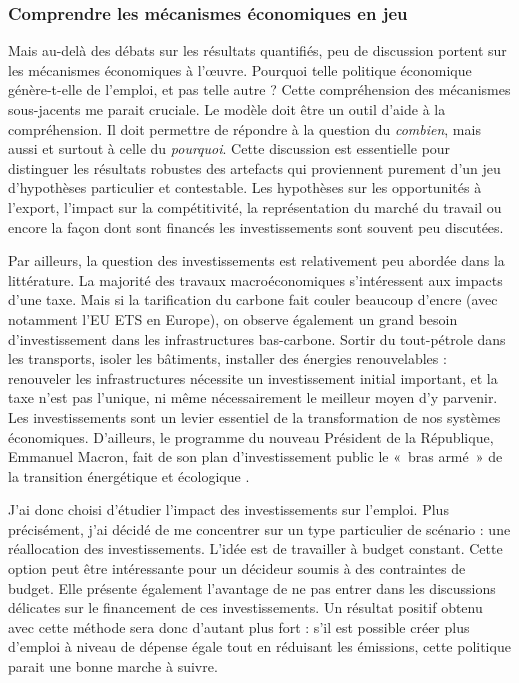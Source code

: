 \subsubsection{Comprendre les mécanismes économiques en jeu}



Mais au-delà des débats sur les résultats quantifiés, peu de discussion portent sur les mécanismes économiques à l'\oe{}uvre. Pourquoi telle politique économique génère-t-elle de l'emploi, et pas telle autre ? 
Cette compréhension des mécanismes sous-jacents me parait cruciale. Le modèle doit être un outil d'aide à la compréhension. Il doit permettre de répondre à la question du \textit{combien}, mais aussi et surtout à celle du \textit{pourquoi}.
Cette discussion est essentielle pour distinguer les résultats robustes des artefacts qui proviennent purement d'un jeu d'hypothèses particulier et contestable.
Les hypothèses sur les opportunités à l'export, l'impact sur la compétitivité, la représentation du marché du travail ou encore la façon dont sont financés les investissements sont souvent peu discutées.

Par ailleurs, la question des investissements est relativement peu abordée dans la littérature. La majorité des travaux macroéconomiques s'intéressent aux impacts d'une taxe. Mais si la tarification du carbone fait couler beaucoup d'encre (avec notamment l'EU ETS en Europe), on observe également un grand besoin d'investissement dans les infrastructures bas-carbone. 
Sortir du tout-pétrole dans les transports, isoler les bâtiments, installer des énergies renouvelables : renouveler les infrastructures nécessite un investissement initial important, et la taxe n'est pas l'unique, ni même nécessairement le meilleur moyen d'y parvenir. Les investissements sont un levier essentiel de la transformation de nos systèmes économiques. D'ailleurs, le programme du nouveau Président de la République, Emmanuel Macron, fait de son plan d'investissement public le «~bras armé~» de la transition énergétique et écologique \citep{Zaouati2017}. 

J'ai donc choisi d'étudier l'impact des investissements sur l'emploi. Plus précisément, j'ai décidé de me concentrer sur un type particulier de scénario : une réallocation des investissements. L'idée est de travailler à budget constant. Cette option peut être intéressante pour un décideur soumis à des contraintes de budget. Elle présente également l'avantage de ne pas entrer dans les discussions délicates sur le financement de ces investissements. Un résultat positif obtenu avec cette méthode sera donc d'autant plus fort : s'il est possible créer plus d'emploi à niveau de dépense égale tout en réduisant les émissions, cette politique parait une bonne marche à suivre.

